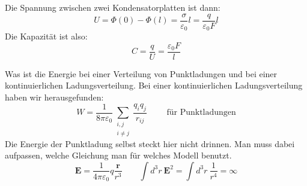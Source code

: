\documentclass[titlepage,11pt,a4paper,ngerman]{report}
\renewcommand{\Phi}{\varPhi}
\newcommand{\kq}{\frac{1}{4\pi\epsilon_0}}
\renewcommand{\vec}[1]{\boldsymbol{#1}}
\newcommand{\lcom}[1]{\color{MidnightBlue}#1\color{black}}
\renewcommand{\epsilon}{\varepsilon}
\begin{document}
\noindent
Die Spannung zwischen zwei Kondensatorplatten ist dann:
\begin{equation*}
U = \Phi(0) - \Phi(l) = \frac{\sigma}{\epsilon_0} l = \frac{q}{\epsilon_0 F} l
\end{equation*}
Die Kapazität ist also:
\begin{equation*}
C = \frac{q}{U} = \frac{\epsilon_0 F}{l}
\end{equation*}

\noindent
\lcom{Was ist die Energie bei einer Verteilung von Punktladungen und bei einer kontinuierlichen Ladungsverteilung. Bei einer kontinuierlichen Ladungsverteilung haben wir herausgefunden:}
$$W = \frac{1}{8 \pi \epsilon_0} \sum_{\substack{i,j\\ i \neq j}} \frac{q_i q_j}{r_{ij}} \qquad \textrm{ für Punktladungen}$$
\lcom{Die Energie der Punktladung selbst steckt hier nicht drinnen. Man muss dabei aufpassen, welche Gleichung man für welches Modell benutzt.}
$$\vec{E} = \kq q \frac{\vec{r}}{r^3} \qquad \int d^3 r\ \vec{E}^2 = \int d^3 r\ \frac{1}{r^4} = \infty$$
\end{document}

